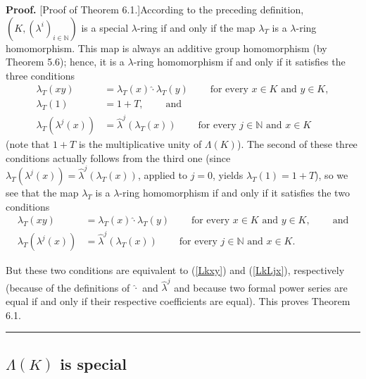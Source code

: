 \documentclass[numbers=enddot,12pt,final,onecolumn,notitlepage]{scrartcl}%
\newenvironment{proof}[1][Proof]{\noindent\textbf{#1.} }{\ \rule{0.5em}{0.5em}}
\begin{document}
\begin{proof}
[Proof of Theorem 6.1.]According to the preceding definition, $\left(
K,\left(  \lambda^{i}\right)  _{i\in\mathbb{N}}\right)  $ is a special
$\lambda$-ring if and only if the map $\lambda_{T}$ is a $\lambda$-ring
homomorphism. This map is always an additive group homomorphism (by Theorem
5.6); hence, it is a $\lambda$-ring homomorphism if and only if it satisfies
the three conditions%
\begin{align*}
\lambda_{T}\left(  xy\right)   &  =\lambda_{T}\left(  x\right)  \widehat{\cdot
}\lambda_{T}\left(  y\right)  \ \ \ \ \ \ \ \ \ \ \text{for every }x\in
K\text{ and }y\in K,\\
\lambda_{T}\left(  1\right)   &  =1+T,\ \ \ \ \ \ \ \ \ \ \text{and}\\
\lambda_{T}\left(  \lambda^{j}\left(  x\right)  \right)   &  =\widehat{\lambda
}^{j}\left(  \lambda_{T}\left(  x\right)  \right)
\ \ \ \ \ \ \ \ \ \ \text{for every }j\in\mathbb{N}\text{ and }x\in K
\end{align*}
(note that $1+T$ is the multiplicative unity of $\Lambda\left(  K\right)  $).
The second of these three conditions actually follows from the third one
(since $\lambda_{T}\left(  \lambda^{j}\left(  x\right)  \right)
=\widehat{\lambda}^{j}\left(  \lambda_{T}\left(  x\right)  \right)  $, applied
to $j=0$, yields $\lambda_{T}\left(  1\right)  =1+T$), so we see that the map
$\lambda_{T}$ is a $\lambda$-ring homomorphism if and only if it satisfies the
two conditions%
\begin{align*}
\lambda_{T}\left(  xy\right)   &  =\lambda_{T}\left(  x\right)  \widehat{\cdot
}\lambda_{T}\left(  y\right)  \ \ \ \ \ \ \ \ \ \ \text{for every }x\in
K\text{ and }y\in K,\ \ \ \ \ \ \ \ \ \ \text{and}\\
\lambda_{T}\left(  \lambda^{j}\left(  x\right)  \right)   &  =\widehat{\lambda
}^{j}\left(  \lambda_{T}\left(  x\right)  \right)
\ \ \ \ \ \ \ \ \ \ \text{for every }j\in\mathbb{N}\text{ and }x\in K.
\end{align*}


But these two conditions are equivalent to (\ref{Lkxy}) and (\ref{LkLjx}),
respectively (because of the definitions of $\widehat{\cdot}$ and
$\widehat{\lambda}^{j}$ and because two formal power series are equal if and
only if their respective coefficients are equal). This proves Theorem 6.1.
\end{proof}

\subsection{$\Lambda\left(  K\right)  $ is special}
\end{document}
